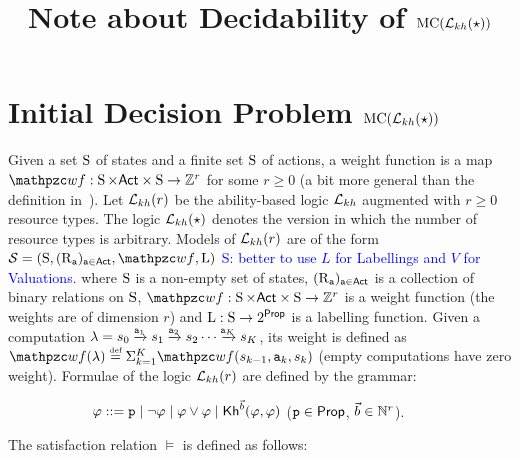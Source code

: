 \documentclass[envcountsame,a4paper,12pt]{llncs}
\title{Note about  Decidability  of ${\rm MC (}\mathcal{L}_{kh}(\star){\rm )}$}
\author{}
\date{ }
\begin{document}
\pagestyle{plain}


\maketitle

\section{Initial Decision Problem ${\rm MC (}\mathcal{L}_{kh}(\star){\rm )}$}

Given a set $\operatorname{S}$ of states  and a finite set $\operatorname{S}$ of actions, a weight function is a map
$\wf : \states \times  \ACT \times \states \ra \Zed^r$ for some  $r{\geq}0$ (a bit more general than the definition
in~\cite{Demri&Fervari23}).
Let $\mathcal{L}_{kh}(r)$ be the ability-based logic $\mathcal{L}_{kh}$ augmented with $r \geq 0$ resource types.
The logic $\mathcal{L}_{kh}(\star)$ denotes the version in which the number of resource types is arbitrary.
Models of $\mathcal{L}_{kh}(r)$ are of the form $\alts = \triple{\states}{\relations,\wf}{\avaluation}$
\textcolor{blue}{S: better to use $L$ for Labellings and $V$ for Valuations.}
where $ \operatorname{S}$ is a non-empty set of states, $(\operatorname{R}_{\mathtt{a}})_{\mathtt{a} \in {\rm \sf Act}}$ is a collection of binary relations on $ \operatorname{S}$, 
$\wf: \states \times  \ACT \times \states \ra \Zed^r$ is a weight function
(the weights are of dimension $r$) and $\operatorname{L}: \operatorname{S} \to 2^{\rm \sf Prop}$ is a labelling function.
Given a computation 
$\acomputation = \astate_0 \step{\aaction_1} \astate_1 \step{\aaction_2} \astate_2 \cdots 
\step{\aaction_K} \astate_K$, its weight is defined as %
$\wf(\acomputation)  \egdef \Sigma^{K}_{k=1} \wf(\astate_{k-1},\aaction_k, \astate_{k})$ (empty computations have zero weight).
Formulae of the logic $\mathcal{L}_{kh}(r)$ are defined by the grammar:
    \begin{nscenter}
      \ \ \ \ \ \ \ \ \ \ \ \ $\varphi ::= \mathtt{p} \mid \neg \varphi \mid \varphi \vee \varphi  \mid
      {\operatorname{\sf Kh}}^{\vec{b}}(\varphi,\varphi)$ \hfill ($\mathtt{p} \in {\rm \sf Prop}$, $\vec{b} \in \mathbb{N}^r$).
    \end{nscenter}

The satisfaction relation $\models$ is defined as follows:
\end{document}
